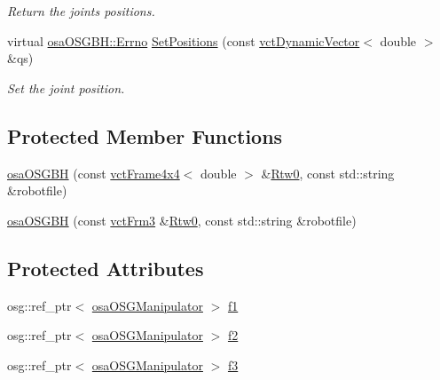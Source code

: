 \begin{DoxyCompactItemize}
\begin{DoxyCompactList}\small\item\em Return the joints positions. \end{DoxyCompactList}\item 
virtual \hyperlink{classrob_manipulator_a7bbb51cdb81c9c681075a9274ca0cdc0}{osa\+O\+S\+G\+B\+H\+::\+Errno} \hyperlink{classosa_o_s_g_b_h_a28a1caf6b03681ac71e0da5b2349f5b4}{Set\+Positions} (const \hyperlink{classvct_dynamic_vector}{vct\+Dynamic\+Vector}$<$ double $>$ \&qs)
\begin{DoxyCompactList}\small\item\em Set the joint position. \end{DoxyCompactList}\end{DoxyCompactItemize}
\subsection*{Protected Member Functions}
\begin{DoxyCompactItemize}
\item 
\hyperlink{classosa_o_s_g_b_h_afc21f71126c141e33c83dc2433f13522}{osa\+O\+S\+G\+B\+H} (const \hyperlink{classvct_frame4x4}{vct\+Frame4x4}$<$ double $>$ \&\hyperlink{classrob_manipulator_ab48d9d9a166bf252698bc35788ca6ad6}{Rtw0}, const std\+::string \&robotfile)
\item 
\hyperlink{classosa_o_s_g_b_h_ae201579cdcf5beb277718a6a5af439d3}{osa\+O\+S\+G\+B\+H} (const \hyperlink{vct_transformation_types_8h_a81feda0a02c2d1bc26e5553f409fed20}{vct\+Frm3} \&\hyperlink{classrob_manipulator_ab48d9d9a166bf252698bc35788ca6ad6}{Rtw0}, const std\+::string \&robotfile)
\end{DoxyCompactItemize}
\subsection*{Protected Attributes}
\begin{DoxyCompactItemize}
\item 
osg\+::ref\+\_\+ptr$<$ \hyperlink{classosa_o_s_g_manipulator}{osa\+O\+S\+G\+Manipulator} $>$ \hyperlink{classosa_o_s_g_b_h_a836e1fcb735edb2527ab520e5bf0f34f}{f1}
\item 
osg\+::ref\+\_\+ptr$<$ \hyperlink{classosa_o_s_g_manipulator}{osa\+O\+S\+G\+Manipulator} $>$ \hyperlink{classosa_o_s_g_b_h_a46d2249c302d3056e4758fe9ad2fd61c}{f2}
\item 
osg\+::ref\+\_\+ptr$<$ \hyperlink{classosa_o_s_g_manipulator}{osa\+O\+S\+G\+Manipulator} $>$ \hyperlink{classosa_o_s_g_b_h_a3f1f482d0c054f21e42116d809a9c1b4}{f3}
\end{DoxyCompactItemize}
